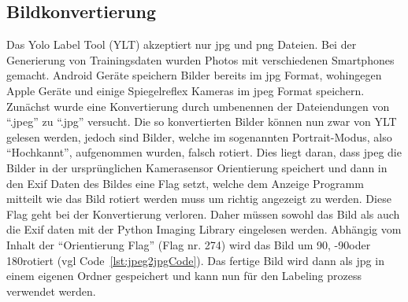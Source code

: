 \documentclass[a4paper,oneside,12pt]{report}
\begin{document}
\begin{onehalfspace}
			\subsection{Bildkonvertierung}
				Das Yolo Label Tool (YLT) akzeptiert nur jpg und png Dateien. Bei der Generierung von Trainingsdaten wurden Photos mit verschiedenen Smartphones gemacht. Android Geräte speichern Bilder bereits im jpg Format, wohingegen Apple Geräte und einige Spiegelreflex Kameras im jpeg Format speichern. Zunächst wurde eine Konvertierung durch umbenennen der Dateiendungen von "`.jpeg"' zu "`.jpg"' versucht. Die so konvertierten Bilder können nun zwar von YLT gelesen werden, jedoch sind Bilder, welche im sogenannten Portrait-Modus, also "`Hochkannt"', aufgenommen wurden, falsch rotiert. Dies liegt daran, dass jpeg die Bilder in der ursprünglichen Kamerasensor Orientierung speichert und dann in den Exif Daten des Bildes eine Flag setzt, welche dem Anzeige Programm mitteilt wie das Bild rotiert werden muss um richtig angezeigt zu werden. Diese Flag geht bei der Konvertierung verloren. Daher müssen sowohl das Bild als auch die Exif daten mit der Python Imaging Library eingelesen werden. Abhängig vom Inhalt der "`Orientierung Flag"' (Flag nr. 274) wird das Bild um 90\degree, -90\degree oder 180\degree rotiert (vgl Code~\ref{lst:jpeg2jpgCode}). Das fertige Bild wird dann als jpg in einem eigenen Ordner gespeichert und kann nun für den Labeling prozess verwendet werden.
				
			
	\end{onehalfspace}
\end{document}
